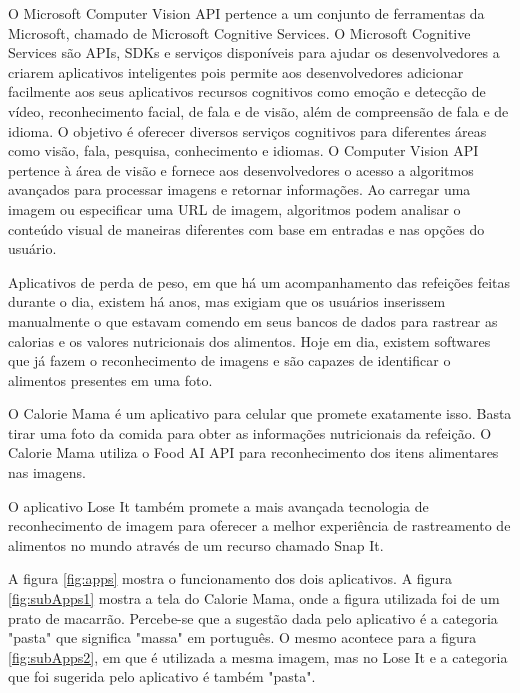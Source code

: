 O Microsoft Computer Vision API \cite{azure_microsoft_computer_vision} pertence a um conjunto de ferramentas da Microsoft, chamado de Microsoft Cognitive Services. O Microsoft Cognitive Services são APIs, SDKs e serviços disponíveis para ajudar os desenvolvedores a criarem aplicativos inteligentes pois permite aos desenvolvedores adicionar facilmente aos seus aplicativos recursos cognitivos como emoção e detecção de vídeo, reconhecimento facial, de fala e de visão, além de compreensão de fala e de idioma. O objetivo é oferecer diversos serviços cognitivos para diferentes áreas como visão, fala, pesquisa, conhecimento e idiomas. O Computer Vision API pertence à área de visão e fornece aos desenvolvedores o acesso a algoritmos avançados para processar imagens e retornar informações. Ao carregar uma imagem ou especificar uma URL de imagem, algoritmos podem analisar o conteúdo visual de maneiras diferentes com base em entradas e nas opções do usuário.

Aplicativos de perda de peso, em que há um acompanhamento das refeições feitas durante o dia, existem há anos, mas exigiam que os usuários inserissem manualmente o que estavam comendo em seus bancos de dados para rastrear as calorias e os valores nutricionais dos alimentos. Hoje em dia, existem softwares que já fazem o reconhecimento de imagens e são capazes de identificar o alimentos presentes em uma foto.

O Calorie Mama \cite{caloriemama_2016} é um aplicativo para celular que promete exatamente isso. Basta tirar uma foto da comida para obter as informações nutricionais da refeição. O Calorie Mama utiliza o Food AI API para reconhecimento dos itens alimentares nas imagens.

O aplicativo Lose It \cite{lose_it} também promete a mais avançada tecnologia de reconhecimento de imagem para oferecer a melhor experiência de rastreamento de alimentos no mundo através de um recurso chamado Snap It.

A figura \ref{fig:apps} mostra o funcionamento dos dois aplicativos. A figura \ref{fig:subApps1} mostra a tela do Calorie Mama, onde a figura utilizada foi de um prato de macarrão. Percebe-se que a sugestão dada pelo aplicativo é a categoria "pasta" que significa "massa" em português. O mesmo acontece para a figura \ref{fig:subApps2}, em que é utilizada a mesma imagem, mas no Lose It e a categoria que foi sugerida pelo aplicativo é também "pasta".

